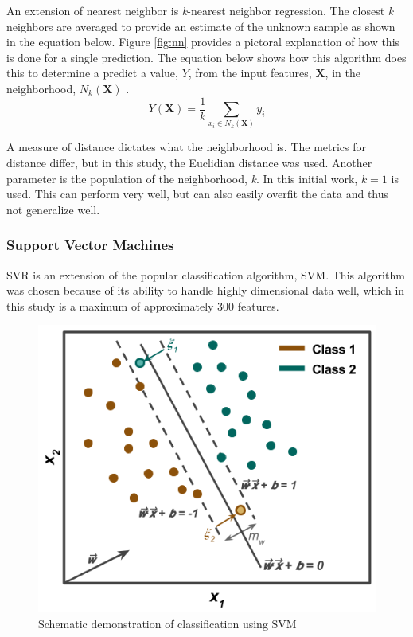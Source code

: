 An extension of nearest neighbor is \textit{k}-nearest neighbor regression.
The closest \textit{k} neighbors are averaged to provide an estimate of the
unknown sample as shown in the equation below.  Figure \ref{fig:nn} provides a
pictoral explanation of how this is done for a single prediction.  The equation
below shows how this algorithm does this to determine a predict a value, $Y$,
from the input features, $\boldsymbol{X}$, in the neighborhood, $N_k
(\boldsymbol{X})$ \cite{elements_stats}. 
\begin{equation}
  Y(\boldsymbol{X}) = \frac{1}{k} \sum_{x_i \in N_k(\boldsymbol{X})} y_i
\end{equation}

A measure of distance dictates what the neighborhood is. The metrics for
distance differ, but in this study, the Euclidian distance was used. Another
parameter is the population of the neighborhood, \textit{k}. In this initial
work, $k = 1$ is used. This can perform very well, but can also easily overfit
the data and thus not generalize well. 

\subsubsection{Support Vector Machines}
\label{sec:svm}

\Gls{SVR} is an extension of the popular classification algorithm, \gls{SVM}.
This algorithm was chosen because of its ability to handle highly dimensional
data well, which in this study is a maximum of approximately 300 features. 

\begin{figure}[!htb]
  \centering
  \includegraphics[width=0.8\linewidth]{./chapters/litrev/svm.png}
  \caption{Schematic demonstration of classification using SVM}
  \label{fig:svm}
\end{figure}

